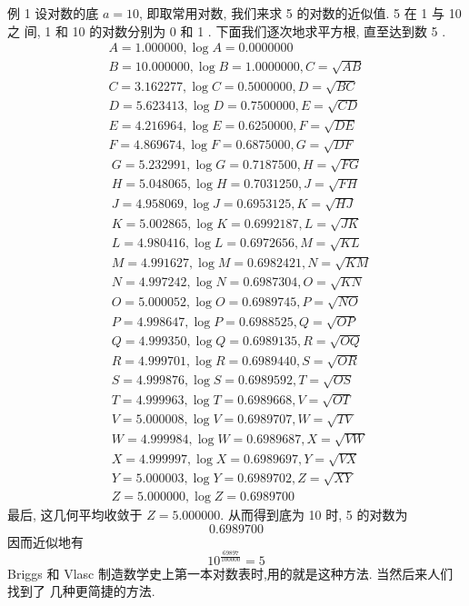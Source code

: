 例 1 设对数的底 $a=10$, 即取常用对数, 我们来求 5 的对数的近似值. 5 在 1 与 10 之 间, 1 和 10 的对数分别为 0 和 1 . 下面我们逐次地求平方根, 直至达到数 5 .
\[
\begin{gathered}
A=1.000000, \log A=0.0000000 \\
B=10.000000, \log B=1.0000000, C=\sqrt{A B} \\
C=3.162277, \log C=0.5000000, D=\sqrt{B C} \\
D=5.623413, \log D=0.7500000, E=\sqrt{C D} \\
E=4.216964, \log E=0.6250000, F=\sqrt{D E} \\
F=4.869674, \log F=0.6875000, G=\sqrt{D F}
\end{gathered}
\]
\[
\begin{aligned}
& G=5.232991, \log G=0.7187500, H=\sqrt{F G} \\
& H=5.048065, \log H=0.7031250, J=\sqrt{F H} \\
& J=4.958069, \log J=0.6953125, K=\sqrt{H J} \\
& K=5.002865, \log K=0.6992187, L=\sqrt{J K} \\
& L= 4.980416, \log L=0.6972656, M=\sqrt{K L} \\
& M= 4.991627, \log M=0.6982421, N=\sqrt{K M} \\
& N= 4.997242, \log N=0.6987304, O=\sqrt{K N} \\
& O= 5.000052, \log O=0.6989745, P=\sqrt{N O} \\
& P= 4.998647, \log P=0.6988525, Q=\sqrt{O P} \\
& Q= 4.999350, \log Q=0.6989135, R=\sqrt{O Q} \\
& R= 4.999701, \log R=0.6989440, S=\sqrt{O R} \\
& S= 4.999876, \log S=0.6989592, T=\sqrt{O S} \\
& T= 4.999963, \log T=0.6989668, V=\sqrt{O T} \\
& V= 5.000008, \log V=0.6989707, W=\sqrt{T V} \\
& W= 4.999984, \log W=0.6989687, X=\sqrt{V W} \\
& X= 4.999997, \log X=0.6989697, Y=\sqrt{V X} \\
& Y= 5.000003, \log Y=0.6989702, Z=\sqrt{X Y} \\
& Z=5.000000, \log Z=0.6989700
\end{aligned}
\]
最后, 这几何平均收敛于 $Z=5.000000$. 从而得到底为 10 时, 5 的对数为
\[
0. 6989700
\]
因而近似地有
\[
10^{\frac{69897}{100000}}=5
\]
Briggs 和 Vlasc 制造数学史上第一本对数表时,用的就是这种方法. 当然后来人们找到了 几种更简捷的方法.


